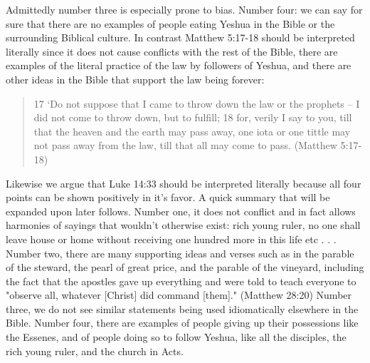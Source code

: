\documentclass[11pt]{article}
\begin{document}
Admittedly number three is especially prone to bias. Number four: we can say for sure that there are no examples of people eating Yeshua in the Bible or the surrounding Biblical culture. In contrast Matthew 5:17-18 should be interpreted literally since it does not cause conflicts with the rest of the Bible, there are examples of the literal practice of the law by followers of Yeshua, and there are other ideas in the Bible that support the law being forever: 
\begin{quote}
17 `Do not suppose that I came to throw down the law or the prophets -- I did not come to throw down, but to fulfill; 18 for, verily I say to you, till that the heaven and the earth may pass away, one iota or one tittle may not pass away from the law, till that all may come to pass. (Matthew 5:17-18) 
\end{quote}
Likewise we argue that Luke 14:33 should be interpreted literally because all four points can be shown positively in it's favor. A quick summary that will be expanded upon later follows. Number one, it does not conflict and in fact allows harmonies of sayings that wouldn't otherwise exist: rich young ruler, no one shall leave house or home without receiving one hundred more in this life etc . . . Number two, there are many supporting ideas and verses such as in the parable of the steward, the pearl of great price, and the parable of the vineyard, including the fact that the apostles gave up everything and were told to teach everyone to "observe all, whatever [Christ] did command [them]." (Matthew 28:20) Number three, we do not see similar statements being used idiomatically elsewhere in the Bible. Number four, there are examples of people giving up their possessions like the Essenes, and of people doing so to follow Yeshua, like all the disciples, the rich young ruler, and the church in Acts.
\end{document}
